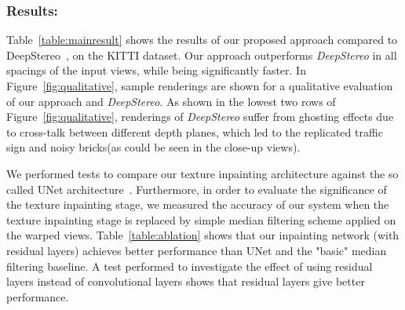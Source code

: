 \documentclass[runningheads]{llncs}
\begin{document}
\subsubsection*{Results:} Table~\ref{table:mainresult} shows the results of our proposed approach compared to DeepStereo~\cite{flynn2015deepstereo}, on the KITTI dataset. Our approach outperforms \textit{DeepStereo} in all spacings of the input views, while being significantly faster. In Figure~\ref{fig:qualitative}, sample renderings are shown for a qualitative evaluation of our approach and \textit{DeepStereo}. As shown in the lowest two rows of Figure~\ref{fig:qualitative}, renderings of \textit{DeepStereo} suffer from ghosting effects due to cross-talk between different depth planes, which led to the replicated traffic sign and noisy bricks(as could be seen in the close-up views).

We performed tests to compare our texture inpainting architecture against the so called UNet architecture~\cite{ronneberger2015u}. Furthermore, in order to evaluate the significance of the texture inpainting stage, we measured the accuracy of our system when the texture inpainting stage is replaced by simple median filtering scheme applied on the warped views. Table~\ref{table:ablation} shows that our inpainting network (with residual layers) achieves better performance than UNet and the "basic" median filtering baseline. A test performed to investigate the effect of using residual layers instead of convolutional layers shows that residual layers give better performance.
\end{document}
